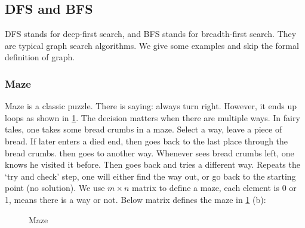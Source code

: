 \documentclass[b5paper]{article}
\begin{document}
\subsection{DFS and BFS}
 
\label{sec:DFS-BFS}

DFS stands for deep-first search, and BFS stands for breadth-first search. They are typical graph search algorithms. We give some examples and skip the formal definition of graph.

\subsubsection{Maze}
Maze is a classic puzzle. There is saying: always turn right. However, it ends up loops as shown in \cref{fig:maze-loop}. The decision matters when there are multiple ways. In fairy tales, one takes some bread crumbs in a maze. Select a way, leave a piece of bread. If later enters a died end, then goes back to the last place through the bread crumbs. then goes to another way. Whenever sees bread crumbs left, one knows he visited it before. Then goes back and tries a different way. Repeats the `try and check' step, one will either find the way out, or go back to the starting point (no solution). We use $m \times n$ matrix to define a maze, each element is 0 or 1, means there is a way or not. Below matrix defines the maze in \cref{fig:maze-loop} (b):

\begin{figure}[htbp]
 \centering
 \caption{Maze}
 \label{fig:maze-loop}
\end{figure}
\end{document}
